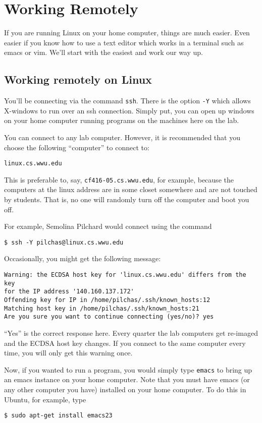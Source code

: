 \documentclass[12pt]{article}
\begin{document}
\section{Working Remotely}
If you are running Linux on your home computer, things are much easier. Even easier if you know how to use a text editor which works in a terminal such as emacs or vim. We'll start with the easiest and work our way up.

\subsection{Working remotely on Linux}
You'll be connecting via the command \verb|ssh|. There is the option \verb|-Y| which allows X-windows to run over an ssh connection. Simply put, you can open up windows on your home computer running programs on the machines here on the lab.


You can connect to any lab computer. However, it is recommended that you choose the following ``computer'' to connect to:
\begin{verbatim}
linux.cs.wwu.edu
\end{verbatim}
This is preferable to, say, \verb|cf416-05.cs.wwu.edu|, for example, because the computers at the linux address are in some closet somewhere and are not touched by students. That is, no one will randomly turn off the computer and boot you off.

For example, Semolina Pilchard would connect using the command
\begin{verbatim}
$ ssh -Y pilchas@linux.cs.wwu.edu
\end{verbatim}

Occasionally, you might get the following message:
\begin{verbatim}
Warning: the ECDSA host key for 'linux.cs.wwu.edu' differs from the key
for the IP address '140.160.137.172'
Offending key for IP in /home/pilchas/.ssh/known_hosts:12
Matching host key in /home/pilchas/.ssh/known_hosts:21
Are you sure you want to continue connecting (yes/no)? yes
\end{verbatim}
``Yes'' is the correct response here. Every quarter the lab computers get re-imaged and the ECDSA host key changes. If you connect to the same computer every time, you will only get this warning once.

Now, if you wanted to run a program, you would simply type \verb|emacs| to bring up an emacs instance on your home computer. Note that you must have emacs (or any other computer you have) installed on your home computer. To do this in Ubuntu, for example, type
\begin{verbatim}
$ sudo apt-get install emacs23
\end{verbatim}
\end{document}

